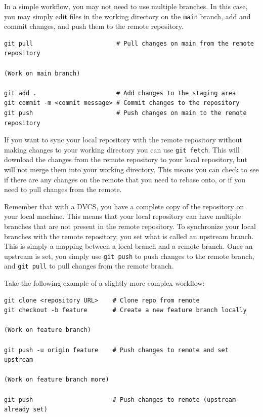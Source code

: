 \documentclass[fleqn]{article}
\begin{document}
In a simple workflow, you may not need to use multiple branches. In this case,
you may simply edit files in the working directory on the \texttt{main} branch,
add and commit changes, and push them to the remote repository.

\begin{lstlisting}
git pull                       # Pull changes on main from the remote repository

(Work on main branch)

git add .                      # Add changes to the staging area
git commit -m <commit message> # Commit changes to the repository
git push                       # Push changes on main to the remote repository
\end{lstlisting}

If you want to sync your local repository with the remote repository without
making changes to your working directory you can use \texttt{git fetch}. This
will download the changes from the remote repository to your local repository,
but will not merge them into your working directory. This means you can check
to see if there are any changes on the remote that you need to rebase onto, or
if you need to pull changes from the remote.

Remember that with a DVCS, you have a complete copy of the repository on your
local machine. This means that your local repository can have multiple branches
that are not present in the remote repository. To synchronize your local
branches with the remote repository, you set what is called an upstream branch.
This is simply a mapping between a local branch and a remote branch. Once an
upstream is set, you simply use \texttt{git push} to push changes to the remote
branch, and \texttt{git pull} to pull changes from the remote branch.

Take the following example of a slightly more complex workflow:

\begin{lstlisting}
git clone <repository URL>    # Clone repo from remote
git checkout -b feature       # Create a new feature branch locally

(Work on feature branch)

git push -u origin feature    # Push changes to remote and set upstream

(Work on feature branch more)

git push                      # Push changes to remote (upstream already set)
\end{lstlisting}
\end{document}
